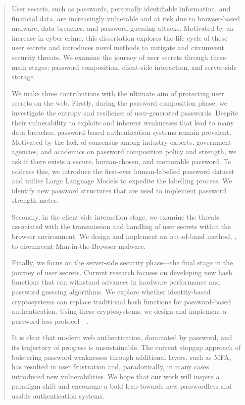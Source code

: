 \cleardoublepage
{}

\begin{abstract}
User secrets, such as passwords, personally identifiable information, and financial data, are increasingly vulnerable and at risk due to browser-based malware, data breaches, and password guessing attacks. Motivated by an increase in cyber crime, this dissertation explores the life cycle of these user secrets and introduces novel methods to mitigate and circumvent security threats. We examine the journey of user secrets through three main stages: password composition, client-side interaction, and server-side storage.

We make three contributions with the ultimate aim of protecting user secrets on the web. Firstly, during the password composition phase, we investigate the entropy and resilience of user-generated passwords. Despite their vulnerability to exploits and inherent weaknesses that lead to many data breaches, password-based authentication systems remain prevalent. Motivated by the lack of consensus among industry experts, government agencies, and academics on password composition policy and strength, we ask if there exists a secure, human-chosen, and memorable password. To address this, we introduce the first-ever human-labelled password dataset and utilise Large Language Models to expedite the labelling process. We identify new password structures that are used to implement password strength meter.

Secondly, in the client-side interaction stage, we examine the threats associated with the transmission and handling of user secrets within the browser environment. 
We design and implement an out-of-band method, \formless, to circumvent Man-in-the-Browser malware. %

Finally, we focus on the server-side security phase---the final stage in the journey of user secrets. Current research focuses on developing new hash functions that can withstand advances in hardware performance and password guessing algorithms. We explore whether identity-based cryptosystems can replace traditional hash functions for password-based authentication. Using these cryptosystems, we design and implement a password-less protocol---\deeid.

It is clear that modern web authentication, dominated by password, and its trajectory of progress is unsustainable. The current stopgap approach of bolstering password weaknesses through additional layers, such as MFA, has resulted in user frustration and, paradoxically, in many cases introduced new vulnerabilities. We hope that our work will inspire a paradigm shift and encourage a bold leap towards new passwordless and usable authentication systems.

\end{abstract}

\setcounter{page}{1}
